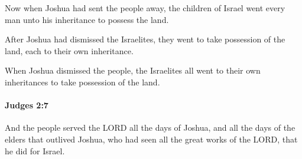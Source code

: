 			\begin{versebox}
					\item[BHS] 
					\item[ASV] Now when Joshua had sent the people away, the children of Israel went every man unto his inheritance to possess the land.
					\item[NIV] After Joshua had dismissed the Israelites, they went to take possession of the land, each to their own inheritance.
					\item[NRSV] When Joshua dismissed the people, the Israelites all went to their own inheritances to take possession of the land.
			\end{versebox}

		\paragraph{Judges 2:7} %
			\label{JUDGES-2-7}

			And the people served the LORD all the days of Joshua, and all the days of the elders that outlived Joshua, who had seen all the great works of the LORD, that he did for Israel.


